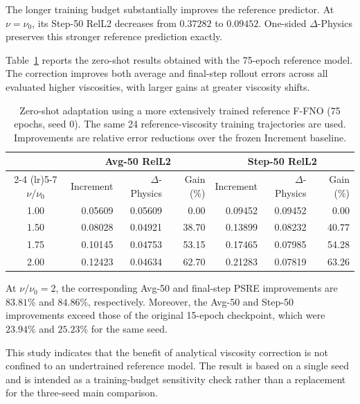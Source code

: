 \documentclass[10pt,twocolumn]{article}
\begin{document}
The longer training budget substantially improves the
reference predictor. At $\nu=\nu_0$, its Step-50
RelL2 decreases from $0.37282$ to $0.09452$.
One-sided $\Delta$-Physics preserves this stronger
reference prediction exactly.

Table~\ref{tab:training_budget} reports the zero-shot
results obtained with the 75-epoch reference model.
The correction improves both average and final-step
rollout errors across all evaluated higher viscosities,
with larger gains at greater viscosity shifts.

\begin{table}[t]
\centering
\small
\setlength{\tabcolsep}{7pt}
\caption{
Zero-shot adaptation using a more extensively trained
reference F-FNO (75 epochs, seed 0). The same 24
reference-viscosity training trajectories are used.
Improvements are relative error reductions over
the frozen Increment baseline.
}
\label{tab:training_budget}
\begin{tabular}{c r r r r r r}
\toprule
& \multicolumn{3}{c}{Avg-50 RelL2}
& \multicolumn{3}{c}{Step-50 RelL2} \\
\cmidrule(lr){2-4}
\cmidrule(lr){5-7}
$\nu/\nu_0$
& Increment
& $\Delta$-Physics
& Gain (\%)
& Increment
& $\Delta$-Physics
& Gain (\%) \\
\midrule
1.00 & 0.05609 & 0.05609 & 0.00
     & 0.09452 & 0.09452 & 0.00 \\
1.50 & 0.08028 & 0.04921 & 38.70
     & 0.13899 & 0.08232 & 40.77 \\
1.75 & 0.10145 & 0.04753 & 53.15
     & 0.17465 & 0.07985 & 54.28 \\
2.00 & 0.12423 & 0.04634 & 62.70
     & 0.21283 & 0.07819 & 63.26 \\
\bottomrule
\end{tabular}
\end{table}

At $\nu/\nu_0=2$, the corresponding Avg-50
and final-step PSRE improvements are $83.81\%$
and $84.86\%$, respectively. Moreover, the
Avg-50 and Step-50 improvements exceed those
of the original 15-epoch checkpoint, which were
$23.94\%$ and $25.23\%$ for the same seed.

This study indicates that the benefit of analytical
viscosity correction is not confined to an
undertrained reference model. The result is
based on a single seed and is intended as a
training-budget sensitivity check rather than
a replacement for the three-seed main comparison.
\end{document}
